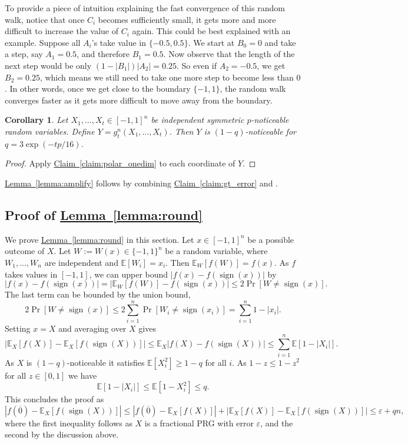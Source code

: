 \documentclass[11pt]{article}
\numberwithin{equation}{section}
\newtheorem{corollary}[theorem]{Corollary}
\theoremstyle{definition}
\theoremstyle{plain}
\newcommand{\expref}[2]{\hyperref[#2]{#1~\ref{#2}}}
\newcommand{\E}{\mathbb{E}}
\newcommand{\eps}{\varepsilon}
\DeclareMathOperator{\sign}{sign}     %
\newcommand{\zero}{\overline{0}}
\begin{document}
To provide a piece of intuition explaining the fast convergence of this random walk, notice that once $C_i$ becomes sufficiently small, it gets more and more difficult to increase the value of $C_i$ again. This could be best explained with an example. Suppose all $A_i$'s take value in $\{-0.5,0.5\}$. We start at $B_0 = 0$ and take a step, say $A_1 = 0.5$, and therefore $B_1 = 0.5$. Now observe that the length of the next step would be only $(1-|B_1|)|A_2| = 0.25$. So even if $A_2 = -0.5$, we get $B_2 = 0.25$, which means we still need to take one more step to become less than $0$.  In other words, once we get close to the boundary $\{-1,1\}$, the random walk  converges faster as it gets more difficult to move away from the boundary.

\begin{corollary}
\label{cor:polar}
Let $X_1,\ldots,X_t \in [-1,1]^n$ be independent symmetric $p$-noticeable random variables. Define
$Y=g_t^n(X_1,\ldots,X_t)$.
Then $Y$ is $(1-q)$-noticeable for $q=3 \exp(-tp/16)$.
\end{corollary}

\begin{proof}
Apply \expref{Claim}{claim:polar_onedim} to each coordinate of $Y$.
\end{proof}

\expref{Lemma}{lemma:amplify} follows by combining \expref{Claim}{claim:gt_error} and .

\subsection{Proof of \expref{Lemma}{lemma:round}}
We prove \expref{Lemma}{lemma:round} in this section.
Let $x \in [-1,1]^n$ be a possible outcome of $X$. Let $W:=W(x) \in \{-1,1\}^n$
be a random variable, where $W_1,\ldots,W_n$ are independent and $\E[W_i]=x_i$. Then $\E_W[f(W)] = f(x)$.
As $f$ takes values in $[-1,1]$, we can upper bound $|f(x)-f(\sign(x))|$ by
$$
|f(x) - f(\sign(x))| = |\E_W [f(W)] - f(\sign(x))| \le 2\Pr[W \ne \sign(x)].
$$
The last term can be bounded by the union bound,
$$
2\Pr[W \ne \sign(x)] \le 2\sum_{i=1}^n \Pr[W_i \ne \sign(x_i)] = \sum_{i=1}^n 1-|x_i|.
$$
Setting $x=X$ and averaging over $X$ gives
$$
|\E_X [f(X)] - \E_X [f(\sign(X))]| \le
\E_X|f(X) - f(\sign(X))| \le
 \sum_{i=1}^n \E[1-|X_i|].
$$
As $X$ is $(1-q)$-noticeable it satisfies $\E[X_i^2] \ge 1-q$ for all $i$.
As $1-z \le 1-z^2$ for all $z \in [0,1]$ we have
$$
\E[1-|X_i|] \le \E[1-X_i^2] \le q.
$$
This concludes the proof as
$$
|f(\zero) - \E_X [f(\sign(X))]| \le
|f(\zero) - \E_X [f(X)]|+|\E_X [f(X)] - \E_X [f(\sign(X))]| \le \eps+qn,
$$
where the first inequality follows as $X$ is a fractional PRG with
error $\eps$, and the second by the discussion above.
\end{document}
